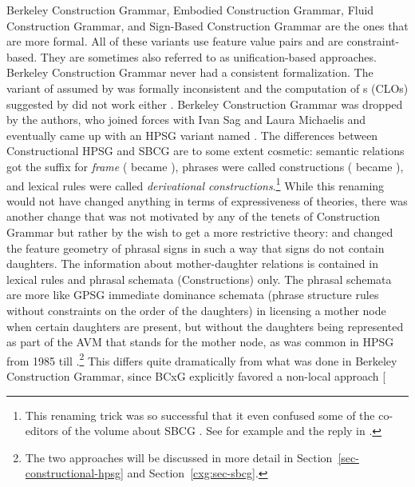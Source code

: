 \documentclass[output=paper
	        ,collection
	        ,collectionchapter
 	        ,biblatex
                ,babelshorthands
                ,newtxmath
                ,draftmode
                ,colorlinks, citecolor=brown
]{langscibook}
\begin{document}
Berkeley Construction Grammar, Embodied Construction Grammar, Fluid Construction Grammar, and
Sign-Based Construction Grammar are the ones that are more formal. All of these variants use feature
value pairs and are constraint-based. They are sometimes also referred to as unification-based
approaches. Berkeley Construction Grammar never had a consistent formalization. The variant of
 assumed by \citet{KF99a} was formally inconsistent \citep[Section~2.4]{Mueller2006d} and the computation of s (CLOs) suggested  by \citet{Kay2002a} did not work either \citep[Section~3]{Mueller2006d}. Berkeley Construction
Grammar was dropped by the authors, who joined forces with Ivan Sag and Laura Michaelis and eventually
came up with an HPSG variant named \sbcg{} \citep{Sag2012a}. The differences between
Constructional HPSG \citep{Sag97a} and SBCG are to some extent cosmetic: semantic relations got the
suffix  for \emph{frame} ( became ), phrases were called constructions ( became
), and lexical rules were called \emph{derivational constructions}.\footnote{
This renaming trick was so successful that it even confused some of the co-editors of the volume about
SBCG \citep{BS2012a-ed}. See for example \citet{Boas2014a} and the reply in \citet{MWArgStReply}.
}
While this renaming would not have changed anything in terms of expressiveness of theories, there
was another change that was not motivated by any of the tenets of Construction Grammar but rather by
the wish to get a more restrictive theory: \citet*{SWB2003a} and \citet{Sag2007a} changed the feature geometry of phrasal
signs in such a way that signs do not contain daughters. The information about mother-daughter relations
is contained in lexical rules and phrasal schemata (Constructions) only. The phrasal schemata are
more like GPSG immediate dominance schemata (phrase structure rules without constraints on the order of the daughters) in licensing a mother node when certain daughters are present,
but without the daughters being represented as part of the AVM that stands for the mother node, as
was common in HPSG from 1985 till \citet*{SWB2003a}.\footnote{%
  The two approaches will be discussed in more detail in Section~\ref{sec-constructional-hpsg} and Section~\ref{cxg:sec-sbcg}.
}
This differs quite dramatically from what was done in Berkeley Construction
Grammar, since BCxG explicitly favored a non-local approach \parencites[]{Fillmore88a}[\page
\end{document}
